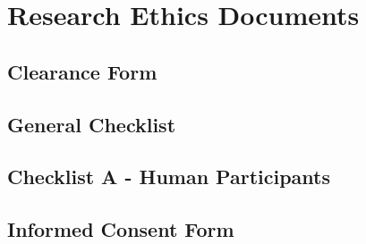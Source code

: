 %
%
%                 

\chapter{Research Ethics Documents}
\label{sec:appendixa}

\section{Clearance Form}


%
\section{General Checklist}


\section{Checklist A - Human Participants}


\section{Informed Consent Form}



